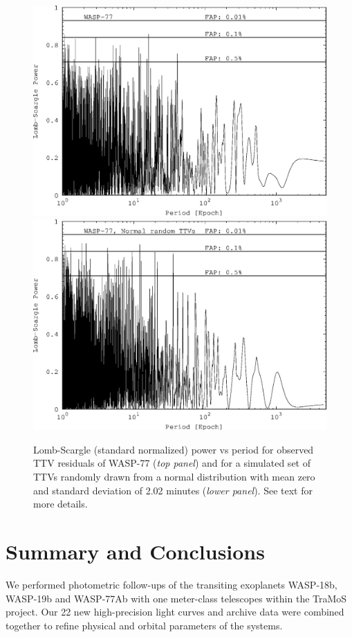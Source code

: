 \begin{figure}
\centering
\includegraphics[width=0.7\columnwidth]{imagenes/LS_WASP77_New_GIMP.png}
\includegraphics[width=0.7\columnwidth]{imagenes/LS_WASP77_NormRandom_New_GIMP.png}
\caption{Lomb-Scargle (standard normalized) power vs period for observed TTV residuals of WASP-77 
(\emph{top panel}) and for a simulated set of TTVs randomly drawn from a normal distribution with mean zero
and standard deviation of 2.02 minutes (\emph{lower panel}). See text for more details.}
\label{LS_wasp77_random}
\end{figure}

\section{Summary and Conclusions}\label{summary}
We performed photometric follow-ups of the transiting exoplanets WASP-18b, WASP-19b and WASP-77Ab with one meter-class telescopes within the TraMoS project. Our 22 new high-precision light curves and archive data were combined together to refine physical and orbital parameters of the systems. 

